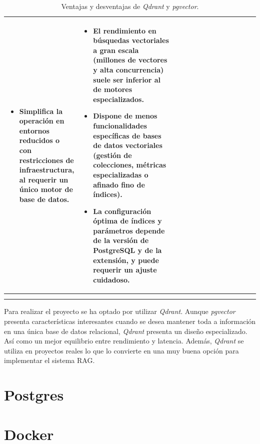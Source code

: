 \begin{longtable}{
		p{0.20\linewidth}
		p{0.40\linewidth}
		p{0.40\linewidth}
	}
\begin{itemize}
        \item Simplifica la operación en entornos reducidos o con restricciones de infraestructura, al requerir un único motor de base de datos.
      \end{itemize}
      &
      \begin{itemize}
        \tightlist
        \item El rendimiento en búsquedas vectoriales a gran escala (millones de vectores y alta concurrencia) suele ser inferior al de motores especializados.
        \item Dispone de menos funcionalidades específicas de bases de datos vectoriales (gestión de colecciones, métricas especializadas o afinado fino de índices).
        \item La configuración óptima de índices y parámetros depende de la versión de PostgreSQL y de la extensión, y puede requerir un ajuste cuidadoso.
      \end{itemize}
      \\
   \bottomrule
   \\
   \caption{Ventajas y desventajas de \textit{Qdrant} y \textit{pgvector}.}
	\label{tab:bases-vectoriales}
\end{longtable}

Para realizar el proyecto se ha optado por utilizar \textit{Qdrant}. Aunque \textit{pgvector} presenta características interesantes cuando se desea mantener toda a información en una única base de datos relacional, \textit{Qdrant} presenta un diseño especializado. Así como un mejor equilibrio entre rendimiento y latencia. Además, \textit{Qdrant} se utiliza en proyectos reales lo que lo convierte en una muy buena opción para implementar el sistema RAG.

\section{Postgres}

\section{Docker}